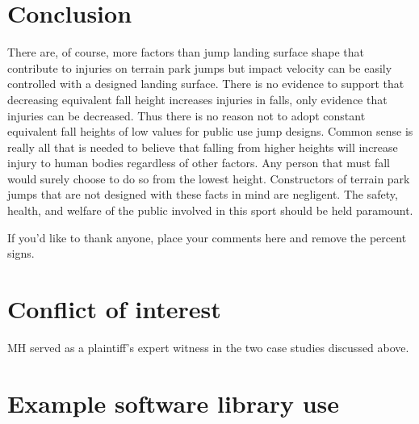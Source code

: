 \documentclass[smallextended]{svjour3}       %
\begin{document}
\section{Conclusion}
\label{sec:conc}
%
There are, of course, more factors than jump landing surface shape that
contribute to injuries on terrain park jumps but impact velocity can be easily
controlled with a designed landing surface. There is no evidence to support
that decreasing equivalent fall height increases injuries in falls, only
evidence that injuries can be decreased. Thus there is no reason not to adopt
constant equivalent fall heights of low values for public use jump designs.
Common sense is really all that is needed to believe that falling from higher
heights will increase injury to human bodies regardless of other factors. Any
person that must fall would surely choose to do so from the lowest height.
Constructors of terrain park jumps that are not designed with these facts in
mind are negligent. The safety, health, and welfare of the public involved in
this sport should be held paramount.

\begin{acknowledgements}
If you'd like to thank anyone, place your comments here
and remove the percent signs.
\end{acknowledgements}

%
\section*{Conflict of interest}
\label{sec:conflict}
%
MH served as a plaintiff's expert witness in the two case studies discussed above.





\appendix

\section{Example software library use}
\label{sec:example}
\end{document}
